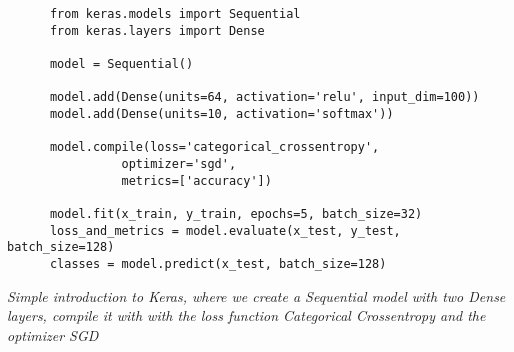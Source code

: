 \begin{code}
  \begin{verbatim}
      from keras.models import Sequential
      from keras.layers import Dense
  
      model = Sequential()
  
      model.add(Dense(units=64, activation='relu', input_dim=100))
      model.add(Dense(units=10, activation='softmax'))
  
      model.compile(loss='categorical_crossentropy',
                optimizer='sgd',
                metrics=['accuracy'])
      
      model.fit(x_train, y_train, epochs=5, batch_size=32)
      loss_and_metrics = model.evaluate(x_test, y_test, batch_size=128)
      classes = model.predict(x_test, batch_size=128)
  \end{verbatim}

  \caption{\textit{Simple introduction to Keras, where we create a Sequential model with two Dense layers, compile it with with the loss function Categorical Crossentropy and the optimizer SGD}}
  \label{code:keras-guide}
\end{code}
